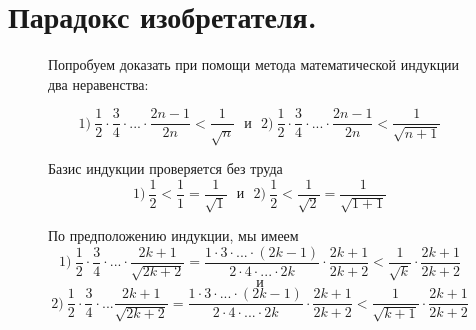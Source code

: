 \newpage

\section{Парадокс изобретателя.}

{\setlength{\intextsep}{2pt}
\begin{figure}[h]
\begin{minipage}{0.74\linewidth}\setlength{\parindent}{1.5em}
Попробуем доказать при помощи метода математической индукции два неравенства:
\par
\begin{equation*}
  1)~\dfrac{1}{2} \cdot \dfrac{3}{4} \cdot ... \cdot \dfrac{2n - 1}{2n} < \dfrac{1}{\sqrt{n}} ~~~и~~~
  2)~\dfrac{1}{2} \cdot \dfrac{3}{4} \cdot ... \cdot \dfrac{2n - 1}{2n} < \dfrac{1}{\sqrt{n + 1}}
\end{equation*}

\par
Базис индукции проверяется без труда
\begin{equation*}
  1)~ \dfrac{1}{2} < \dfrac{1}{1} = \dfrac{1}{\sqrt{1}} ~~~и~~~   
  2)~ \dfrac{1}{2} < \dfrac{1}{\sqrt{2}} = \dfrac{1}{\sqrt{1 + 1}}
\end{equation*}
\par
По предположению индукции, мы имеем
\begin{equation*}
  1)~\dfrac{1}{2} \cdot \dfrac{3}{4} \cdot ... \cdot \dfrac{2k + 1}{\sqrt{2k + 2}} = \dfrac{1 \cdot 3 \cdot ... \cdot (2k - 1)}{2 \cdot 4 \cdot ... \cdot 2k} \cdot \dfrac{2k + 1}{2k + 2} < \dfrac{1}{\sqrt{k}} \cdot \dfrac{2k + 1}{2k + 2}
\end{equation*}
$$и$$
\begin{equation*}
  2)~\dfrac{1}{2} \cdot \dfrac{3}{4} \cdot ... \dfrac{2k + 1}{\sqrt{2k + 2}} = \dfrac{1 \cdot 3 \cdot ... \cdot (2k - 1)}{2 \cdot 4 \cdot ... \cdot 2k} \cdot \dfrac{2k + 1}{2k + 2} < \dfrac{1}{\sqrt{k + 1}} \cdot \dfrac{2k + 1}{2k + 2}
\end{equation*}


\end{minipage}
\end{figure}}

